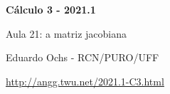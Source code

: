\documentclass[oneside,12pt]{article}
\begin{document}


%
%

\def\C{\mathbb{C}}

\def\drafturl{http://angg.twu.net/LATEX/2021-1-C3.pdf}
\def\drafturl{http://angg.twu.net/2021.1-C3.html}
\def\draftfooter{\tiny \href{\drafturl}{\jobname{}} \ColorBrown{\shorttoday{} \hours}}



%


\thispagestyle{empty}

\begin{center}

\vspace*{1.2cm}

{\bf \Large Cálculo 3 - 2021.1}

\bsk

Aula 21: a matriz jacobiana

\bsk

Eduardo Ochs - RCN/PURO/UFF

\url{http://angg.twu.net/2021.1-C3.html}

\end{center}
\end{document}
